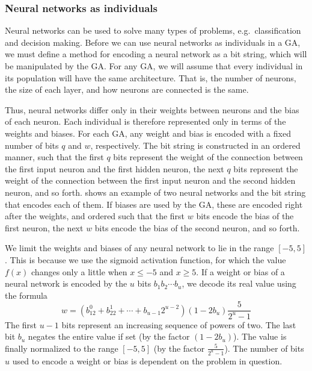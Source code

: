 \subsubsection{Neural networks as individuals}

Neural networks can be used to solve many types of problems, e.g.\ classification and decision making.
Before we can use neural networks as individuals in a GA, we must define a method for encoding a neural network as a bit string, which will be manipulated by the GA\@. For any GA, we will assume that every individual in its population will have the same architecture. That is, the number of neurons, the size of each layer, and how neurons are connected is the same.


Thus, neural networks differ only in their weights between neurons and the bias of each neuron. Each individual is therefore represented only in terms of the weights and biases. For each GA, any weight and bias is encoded with a fixed number of bits $q$ and $w$, respectively. The bit string is constructed in an ordered manner, such that the first $q$ bits represent the weight of the connection between the first input neuron and the first hidden neuron, the next $q$ bits represent the weight of the connection between the first input neuron and the second hidden neuron, and so forth.  shows an example of two neural networks and the bit string that encodes each of them. If biases are used by the GA, these are encoded right after the weights, and ordered such that the first $w$ bits encode the bias of the first neuron, the next $w$ bits encode the bias of the second neuron, and so forth. 

We limit the weights and biases of any neural network to lie in the range $[-5,5]$.
This is because we use the sigmoid activation function, for which the value $f(x)$ changes only a little when $x \leq -5$ and $x  \geq 5$. If a weight or bias of a neural network is encoded by the $u$ bits $b_1 b_2 \cdots b_u$, we decode its real value using the formula
\[
w = (b_12^0 + b_22^1 + \cdots + b_{u-1}2^{u-2})(1-2b_u)\frac{5}{2^u-1}
\]
The first $u-1$ bits represent an increasing sequence of powers of two. The last bit $b_u$ negates the entire value if set (by the factor $(1-2b_u)$). The value is finally normalized to the range $[-5, 5]$ (by the factor $\frac{5}{2^u-1}$).
The number of bits $u$ used to encode a weight or bias is dependent on the problem in question.

